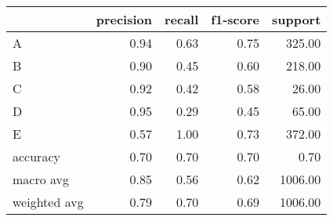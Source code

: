 \begin{tabular}{|l|r|r|r|r|}
\hline
{} &  precision &  recall &  f1-score &  support \\
\hline
A            &       0.94 &    0.63 &      0.75 &   325.00 \\
B            &       0.90 &    0.45 &      0.60 &   218.00 \\
C            &       0.92 &    0.42 &      0.58 &    26.00 \\
D            &       0.95 &    0.29 &      0.45 &    65.00 \\
E            &       0.57 &    1.00 &      0.73 &   372.00 \\
accuracy     &       0.70 &    0.70 &      0.70 &     0.70 \\
macro avg    &       0.85 &    0.56 &      0.62 &  1006.00 \\
weighted avg &       0.79 &    0.70 &      0.69 &  1006.00 \\
\hline
\end{tabular}
